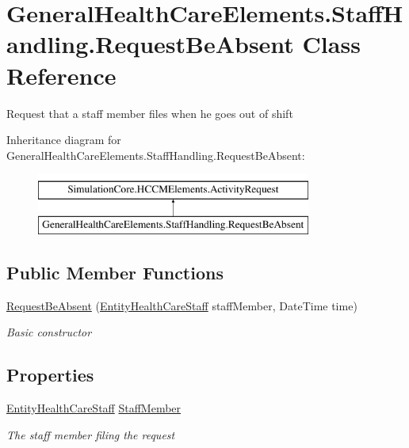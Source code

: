 \hypertarget{class_general_health_care_elements_1_1_staff_handling_1_1_request_be_absent}{}\section{General\+Health\+Care\+Elements.\+Staff\+Handling.\+Request\+Be\+Absent Class Reference}
\label{class_general_health_care_elements_1_1_staff_handling_1_1_request_be_absent}


Request that a staff member files when he goes out of shift  


Inheritance diagram for General\+Health\+Care\+Elements.\+Staff\+Handling.\+Request\+Be\+Absent\+:\begin{figure}[H]
\begin{center}
\leavevmode
\includegraphics[height=2.000000cm]{class_general_health_care_elements_1_1_staff_handling_1_1_request_be_absent}
\end{center}
\end{figure}
\subsection*{Public Member Functions}
\begin{DoxyCompactItemize}
\item 
\hyperlink{class_general_health_care_elements_1_1_staff_handling_1_1_request_be_absent_a519eb7316c06ce52754294b8bc245808}{Request\+Be\+Absent} (\hyperlink{class_general_health_care_elements_1_1_entities_1_1_entity_health_care_staff}{Entity\+Health\+Care\+Staff} staff\+Member, Date\+Time time)
\begin{DoxyCompactList}\small\item\em Basic constructor \end{DoxyCompactList}\end{DoxyCompactItemize}
\subsection*{Properties}
\begin{DoxyCompactItemize}
\item 
\hyperlink{class_general_health_care_elements_1_1_entities_1_1_entity_health_care_staff}{Entity\+Health\+Care\+Staff} \hyperlink{class_general_health_care_elements_1_1_staff_handling_1_1_request_be_absent_a4d022ec924f2528f16506bd266f42b18}{Staff\+Member}
\begin{DoxyCompactList}\small\item\em The staff member filing the request \end{DoxyCompactList}\end{DoxyCompactItemize}


